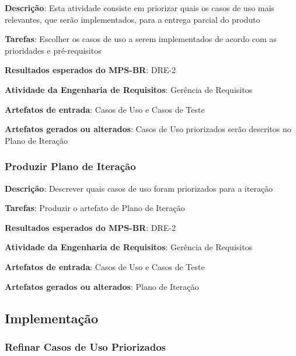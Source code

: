 \begin{description}
\item\textbf{Descrição}: Esta atividade consiste em priorizar quais os casos de uso mais relevantes, que serão implementados, para a entrega parcial do produto
\item\textbf{Tarefas}: Escolher os casos de uso a serem implementados de acordo com as prioridades e pré-requisitos
\item\textbf{Resultados esperados do MPS-BR}: DRE-2
\item\textbf{Atividade da Engenharia de Requisitos}: Gerência de Requisitos
\item\textbf{Artefatos de entrada}: Casos de Uso e Casos de Teste
\item\textbf{Artefatos gerados ou alterados}: Casos de Uso priorizados serão descritos no Plano de Iteração
\end{description}

\subsubsection{Produzir Plano de Iteração}

\begin{description}
\item\textbf{Descrição}: Descrever quais casos de uso foram priorizados para a iteração
\item\textbf{Tarefas}: Produzir o artefato de Plano de Iteração
\item\textbf{Resultados esperados do MPS-BR}: DRE-2
\item\textbf{Atividade da Engenharia de Requisitos}: Gerência de Requisitos
\item\textbf{Artefatos de entrada}: Casos de Uso e Casos de Teste
\item\textbf{Artefatos gerados ou alterados}: Plano de Iteração
\end{description}

\subsection{Implementação}

\subsubsection{Refinar Casos de Uso Priorizados}


